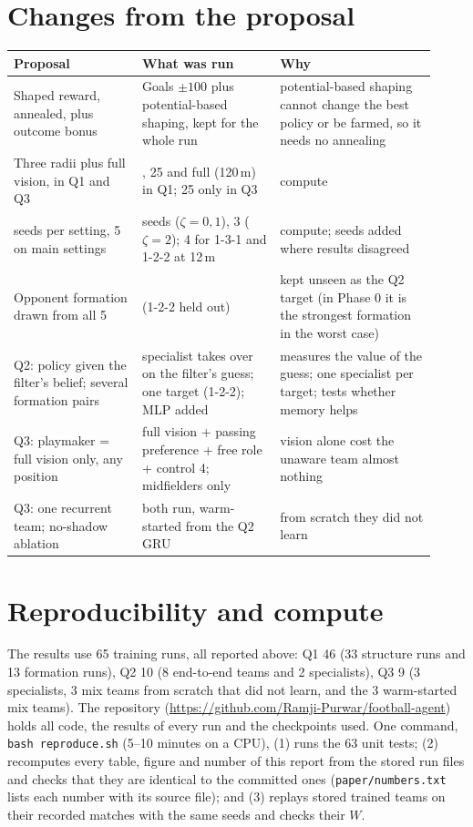 \documentclass{article}
\begin{document}
\section{Changes from the proposal}
\label{app:changes}
\begin{center}
\footnotesize
\begin{tabular}{>{\raggedright\arraybackslash}p{0.28\linewidth}>{\raggedright\arraybackslash}p{0.30\linewidth}>{\raggedright\arraybackslash}p{0.34\linewidth}}
\toprule
Proposal & What was run & Why \\
\midrule
Shaped reward, annealed, plus outcome bonus & Goals $\pm100$ plus potential-based shaping, kept for the whole run &
potential-based shaping cannot change the best policy or be farmed, so it needs no annealing \\
Three radii plus full vision, in Q1 and Q3 & 12, 25 and full (120\,m) in Q1; 25 only in Q3 & compute \\
3 seeds per setting, 5 on main settings & 4 seeds ($\zeta=0,1$), 3 ($\zeta=2$); 4 for 1-3-1 and 1-2-2 at 12\,m &
compute; seeds added where results disagreed \\
Opponent formation drawn from all 5 & 4 (1-2-2 held out) & kept unseen as the Q2 target (in Phase 0 it is the strongest formation in the worst case) \\
Q2: policy given the filter's belief; several formation pairs & specialist takes over on the filter's guess; one target
(1-2-2); MLP added & measures the value of the guess; one specialist per target; tests whether memory helps \\
Q3: playmaker = full vision only, any position & full vision + passing preference + free role + control 4;
midfielders only & vision alone cost the unaware team almost nothing \\
Q3: one recurrent team; no-shadow ablation & both run, warm-started from the Q2 GRU & from scratch they did not learn \\
\bottomrule
\end{tabular}
\end{center}

\section{Reproducibility and compute}
\label{app:repro}
The results use 65 training runs, all reported above: Q1 46 (33 structure runs and 13 formation runs), Q2 10
(8 end-to-end teams and 2 specialists), Q3 9 (3 specialists, 3 mix teams from scratch that did not learn, and the 3
warm-started mix teams). The repository (\url{https://github.com/Ramji-Purwar/football-agent}) holds all code, the
results of every run and the checkpoints used. One command, \texttt{bash reproduce.sh} (5--10 minutes on a CPU),
(1) runs the 63 unit tests; (2) recomputes every table, figure and number of this report from the stored run files and
checks that they are identical to the committed ones (\texttt{paper/numbers.txt} lists each number with its source
file); and (3) replays stored trained teams on their recorded matches with the same seeds and checks their $W$.
\end{document}
